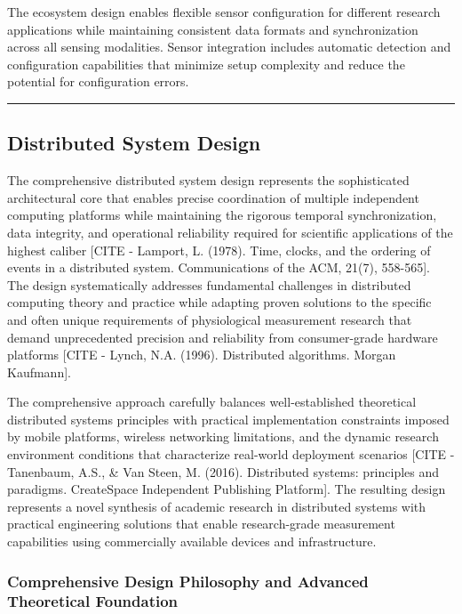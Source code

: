 \documentclass[12pt,a4paper]{article}
\begin{document}
The ecosystem design enables flexible sensor configuration for different research applications while maintaining
consistent data formats and synchronization across all sensing modalities. Sensor integration includes automatic
detection and configuration capabilities that minimize setup complexity and reduce the potential for configuration
errors.

\hrule

\subsection{Distributed System Design}

The comprehensive distributed system design represents the sophisticated architectural core that enables precise
coordination of multiple independent computing platforms while maintaining the rigorous temporal synchronization, data
integrity, and operational reliability required for scientific applications of the highest
caliber [CITE - Lamport, L. (1978). Time, clocks, and the ordering of events in a distributed system. Communications of the ACM, 21(7), 558-565].
The design systematically addresses fundamental challenges in distributed computing theory and practice while adapting
proven solutions to the specific and often unique requirements of physiological measurement research that demand
unprecedented precision and reliability from consumer-grade hardware
platforms [CITE - Lynch, N.A. (1996). Distributed algorithms. Morgan Kaufmann].

The comprehensive approach carefully balances well-established theoretical distributed systems principles with practical
implementation constraints imposed by mobile platforms, wireless networking limitations, and the dynamic research
environment conditions that characterize real-world deployment
scenarios [CITE - Tanenbaum, A.S., \& Van Steen, M. (2016). Distributed systems: principles and paradigms. CreateSpace Independent Publishing Platform].
The resulting design represents a novel synthesis of academic research in distributed systems with practical engineering
solutions that enable research-grade measurement capabilities using commercially available devices and infrastructure.

\subsubsection{Comprehensive Design Philosophy and Advanced Theoretical Foundation}
\end{document}
